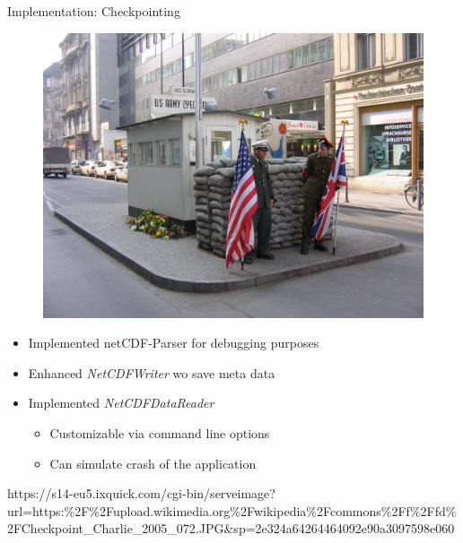\documentclass[shortpres]{beamer}
\begin{document}
\begin{frame}{Implementation: Checkpointing}	
	\begin{figure}
		\includegraphics[width=0.3\linewidth]{img/checkpointcharlie.jpeg}
	\end{figure}
	
	\begin{itemize}
		\item Implemented netCDF-Parser for debugging purposes
		\item Enhanced \textit{NetCDFWriter} wo save meta data
		\item Implemented \textit{NetCDFDataReader}
		\begin{itemize}
			\item Customizable via command line options
			\item Can simulate crash of the application
		\end{itemize}
	\end{itemize}
	
	\vfill
	\flushleft
	{\fontsize{3.5}{3.5} \selectfont 
	https://s14-eu5.ixquick.com/cgi-bin/serveimage?url=https:\%2F\%2Fupload.wikimedia.org\%2Fwikipedia\%2Fcommons\%2Ff\%2Ffd\%2FCheckpoint\_Charlie\_2005\_072.JPG\&sp=2e324a64264464092e90a3097598e060}
\end{frame}
\end{document}
